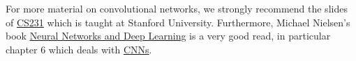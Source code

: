 \documentclass[%
oneside,                 %
final,                   %
10pt]{article}
\begin{document}
\noindent
For more material on convolutional networks, we strongly recommend
the slides of \href{{http://cs231n.github.io/convolutional-networks/}}{CS231} which is taught at Stanford University. Furthermore, Michael Nielsen's book \href{{http://neuralnetworksanddeeplearning.com/index.html}}{Neural Networks and Deep Learning} is a very good read, in particular chapter 6 which deals with \href{{http://neuralnetworksanddeeplearning.com/chap6.html}}{CNNs}.


\end{document}

